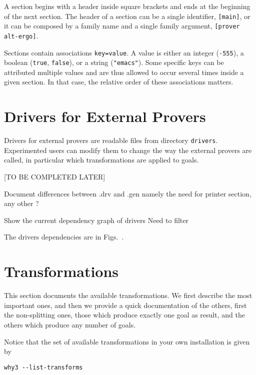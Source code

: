 A section begins with a header inside square brackets and ends at the
beginning of the next section. The header of a section can be a single
identifier, \eg \texttt{[main]}, or it can be composed by a family name
and a single family argument, \eg \texttt{[prover alt-ergo]}.

Sections contain associations \texttt{key=value}. A value is either
an integer (\eg \texttt{-555}), a boolean (\texttt{true}, \texttt{false}),
or a string (\eg \texttt{"emacs"}). Some specific keys can be attributed
multiple values and are
thus allowed to occur several times inside a given section. In that
case, the relative order of these associations matters.

\section{Drivers for External Provers}
\label{sec:drivers}

Drivers for external provers are readable files from directory
\texttt{drivers}. Experimented users can modify them to change the way
the external provers are called, in particular which transformations
are applied to goals.

[TO BE COMPLETED LATER]

Document differences between .drv and .gen namely the need
for printer section, any other ?

Show the current dependency graph of drivers Need to filter




The drivers dependencies are in Figs.~\driversref.

\section{Transformations}
\label{sec:transformations}

This section documents the available transformations. We first
describe the most important ones, and then we provide a quick
documentation of the others, first the non-splitting ones, \eg those
which produce exactly one goal as result, and the others which produce any
number of goals.

Notice that the set of available transformations in your own
installation is given by
\begin{verbatim}
why3 --list-transforms
\end{verbatim}

